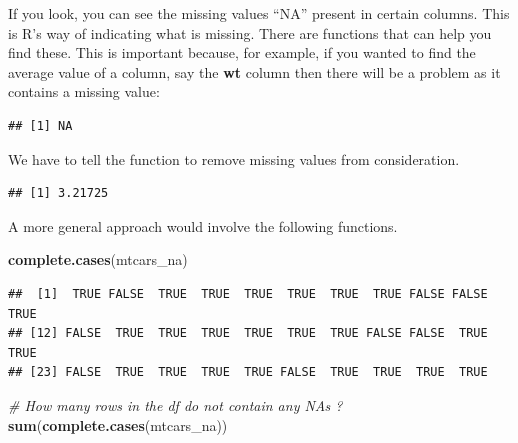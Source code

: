 \documentclass[]{book}
\newenvironment{Shaded}{\begin{snugshade}}{\end{snugshade}}
\newcommand{\KeywordTok}[1]{\textcolor[rgb]{0.13,0.29,0.53}{\textbf{#1}}}
\newcommand{\DataTypeTok}[1]{\textcolor[rgb]{0.13,0.29,0.53}{#1}}
\newcommand{\CommentTok}[1]{\textcolor[rgb]{0.56,0.35,0.01}{\textit{#1}}}
\newcommand{\OtherTok}[1]{\textcolor[rgb]{0.56,0.35,0.01}{#1}}
\newcommand{\OperatorTok}[1]{\textcolor[rgb]{0.81,0.36,0.00}{\textbf{#1}}}
\newcommand{\NormalTok}[1]{#1}
\begin{document}
If you look, you can see the missing values ``NA'' present in certain
columns. This is R's way of indicating what is missing. There are
functions that can help you find these. This is important because, for
example, if you wanted to find the average value of a column, say the
\textbf{wt} column then there will be a problem as it contains a missing
value:

\begin{Shaded}
\end{Shaded}

\begin{verbatim}
## [1] NA
\end{verbatim}

We have to tell the function to remove missing values from
consideration.

\begin{Shaded}
\end{Shaded}

\begin{verbatim}
## [1] 3.21725
\end{verbatim}

A more general approach would involve the following functions.

\begin{Shaded}
\begin{Highlighting}[]
\KeywordTok{complete.cases}\NormalTok{(mtcars_na)}
\end{Highlighting}
\end{Shaded}

\begin{verbatim}
##  [1]  TRUE FALSE  TRUE  TRUE  TRUE  TRUE  TRUE  TRUE FALSE FALSE  TRUE
## [12] FALSE  TRUE  TRUE  TRUE  TRUE  TRUE  TRUE FALSE FALSE  TRUE  TRUE
## [23] FALSE  TRUE  TRUE  TRUE  TRUE FALSE  TRUE  TRUE  TRUE  TRUE
\end{verbatim}

\begin{Shaded}
\begin{Highlighting}[]
\CommentTok{# How many rows in the df do not contain any NAs ?}
\KeywordTok{sum}\NormalTok{(}\KeywordTok{complete.cases}\NormalTok{(mtcars_na))}
\end{Highlighting}
\end{Shaded}
\end{document}
